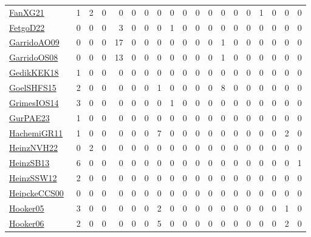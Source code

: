 {\begin{longtable}{l*{18}{r}}
\href{articles/FanXG21.pdf}{FanXG21}~\cite{FanXG21} & 1 & 2 & 0 & 0 & 0 & 0 & 0 & 0 & 0 & 0 & 0 & 0 & 0 & 0 & 1 & 0 & 0 & 0\\
\href{articles/FetgoD22.pdf}{FetgoD22}~\cite{FetgoD22} & 0 & 0 & 0 & 3 & 0 & 0 & 0 & 1 & 0 & 0 & 0 & 0 & 0 & 0 & 0 & 0 & 0 & 0\\
\href{articles/GarridoAO09.pdf}{GarridoAO09}~\cite{GarridoAO09} & 0 & 0 & 0 & 17 & 0 & 0 & 0 & 0 & 0 & 0 & 0 & 1 & 0 & 0 & 0 & 0 & 0 & 0\\
\href{articles/GarridoOS08.pdf}{GarridoOS08}~\cite{GarridoOS08} & 0 & 0 & 0 & 13 & 0 & 0 & 0 & 0 & 0 & 0 & 0 & 1 & 0 & 0 & 0 & 0 & 0 & 0\\
\href{articles/GedikKEK18.pdf}{GedikKEK18}~\cite{GedikKEK18} & 1 & 0 & 0 & 0 & 0 & 0 & 0 & 0 & 0 & 0 & 0 & 0 & 0 & 0 & 0 & 0 & 0 & 0\\
\href{articles/GoelSHFS15.pdf}{GoelSHFS15}~\cite{GoelSHFS15} & 2 & 0 & 0 & 0 & 0 & 0 & 1 & 0 & 0 & 0 & 0 & 8 & 0 & 0 & 0 & 0 & 0 & 0\\
\href{articles/GrimesIOS14.pdf}{GrimesIOS14}~\cite{GrimesIOS14} & 3 & 0 & 0 & 0 & 0 & 0 & 0 & 1 & 0 & 0 & 0 & 0 & 0 & 0 & 0 & 0 & 0 & 0\\
\href{articles/GurPAE23.pdf}{GurPAE23}~\cite{GurPAE23} & 1 & 0 & 0 & 0 & 0 & 0 & 0 & 0 & 0 & 0 & 0 & 0 & 0 & 0 & 0 & 0 & 0 & 0\\
\href{articles/HachemiGR11.pdf}{HachemiGR11}~\cite{HachemiGR11} & 1 & 0 & 0 & 0 & 0 & 0 & 7 & 0 & 0 & 0 & 0 & 0 & 0 & 0 & 0 & 0 & 2 & 0\\
\href{articles/HeinzNVH22.pdf}{HeinzNVH22}~\cite{HeinzNVH22} & 0 & 2 & 0 & 0 & 0 & 0 & 0 & 0 & 0 & 0 & 0 & 0 & 0 & 0 & 0 & 0 & 0 & 0\\
\href{articles/HeinzSB13.pdf}{HeinzSB13}~\cite{HeinzSB13} & 6 & 0 & 0 & 0 & 0 & 0 & 0 & 0 & 0 & 0 & 0 & 0 & 0 & 0 & 0 & 0 & 0 & 1\\
\href{articles/HeinzSSW12.pdf}{HeinzSSW12}~\cite{HeinzSSW12} & 2 & 0 & 0 & 0 & 0 & 0 & 0 & 0 & 0 & 0 & 0 & 0 & 0 & 0 & 0 & 0 & 0 & 0\\
\href{articles/HeipckeCCS00.pdf}{HeipckeCCS00}~\cite{HeipckeCCS00} & 0 & 0 & 0 & 0 & 0 & 0 & 0 & 0 & 0 & 0 & 0 & 0 & 0 & 0 & 0 & 0 & 0 & 0\\
\href{articles/Hooker05.pdf}{Hooker05}~\cite{Hooker05} & 3 & 0 & 0 & 0 & 0 & 0 & 2 & 0 & 0 & 0 & 0 & 0 & 0 & 0 & 0 & 0 & 1 & 0\\
\href{articles/Hooker06.pdf}{Hooker06}~\cite{Hooker06} & 2 & 0 & 0 & 0 & 0 & 0 & 5 & 0 & 0 & 0 & 0 & 0 & 0 & 0 & 0 & 0 & 2 & 0\\

\end{longtable}}
